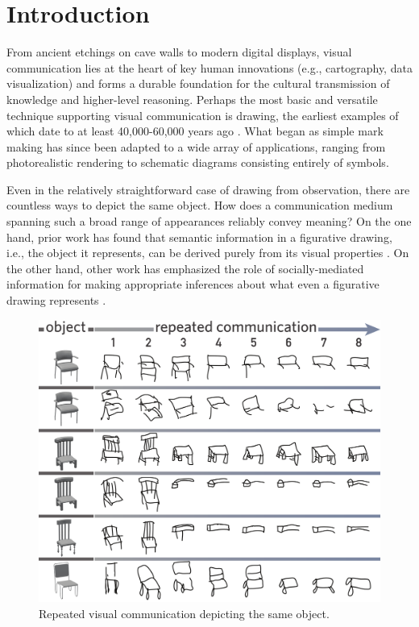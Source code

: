 \documentclass[10pt,letterpaper]{article}
\begin{document}
\section{Introduction}

From ancient etchings on cave walls to modern digital displays, visual communication lies at the heart of key human innovations (e.g., cartography, data visualization) and forms a durable foundation for the cultural transmission of knowledge and higher-level reasoning.
Perhaps the most basic and versatile technique supporting visual communication is drawing, the earliest examples of which date to at least 40,000-60,000 years ago \cite{hoffmann2018u}.
What began as simple mark making has since been adapted to a wide array of applications, ranging from photorealistic rendering to schematic diagrams consisting entirely of symbols.

Even in the relatively straightforward case of drawing from observation, there are countless ways to depict the same object.
How does a communication medium spanning such a broad range of appearances reliably convey meaning?
On the one hand, prior work has found that semantic information in a figurative drawing, i.e., the object it represents, can be derived purely from its visual properties \cite{FanCommon2018}.
On the other hand, other work has emphasized the role of socially-mediated information for making appropriate inferences about what even a figurative drawing represents \cite{goodman1976languages}.

\begin{figure}
\begin{center}
\includegraphics[width=0.7\linewidth]{figures/sketch_gallery.pdf}
\caption{Repeated visual communication depicting the same object.}
\label{sketch_gallery}
\end{center}
\vspace{-1em}
\end{figure}
\end{document}

